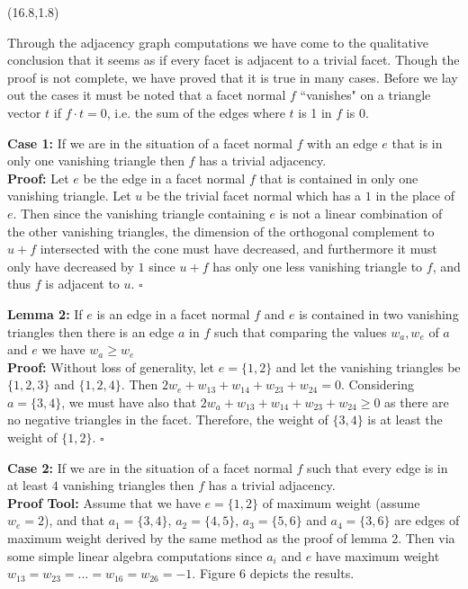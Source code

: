 \documentclass[a0,landscape]{a0poster}  %
\theoremstyle{plain}
\def\LARGEhead#1{\noindent{\LARGE\color{DarkBlue} #1}}
\begin{document}


\begin{textblock}{9.7}(16.8,1.8)

\LARGEhead{Results of the project}

\large{ Through the adjacency graph computations we have come to the qualitative conclusion that it seems as if every facet is adjacent to a trivial facet.  Though the proof is not complete, we have proved that it is true in many cases. Before we lay out the cases it must be noted that a facet normal $f$ ``vanishes" on a triangle vector $t$ if $f \cdot t = 0$, i.e. the sum of the edges where $t$ is 1 in $f$ is $0$. 
}

\large{ {\bf Case 1: } If we are in the situation of a facet normal $f$ with an edge $e$ that is in only one vanishing triangle then $f$ has a trivial adjacency. \\
}
\large{ {\bf Proof: } Let $e$ be the edge in a facet normal $f$ that is contained in only one vanishing triangle. Let $u$ be the trivial facet normal which has a $1$ in the place of $e$. Then since the vanishing triangle containing $e$ is not a linear combination of the other vanishing triangles, the dimension of the orthogonal complement to $u+f$ intersected with the cone must have decreased, and furthermore it must only have decreased by $1$ since $u+f$ has only one less vanishing triangle to $f$, and thus $f$ is adjacent to $u$.  \hfill $\square$
}

\large{{\bf Lemma 2: } If $e$ is an edge in a facet normal $f$ and $e$ is contained in two vanishing triangles then there is an edge $a$ in $f$ such that comparing the values $w_a,w_e$ of $a$ and $e$ we have $w_a \geq w_e$ \\ 
}
\large{{\bf Proof: }  Without loss of generality, let $e = \{1,2\}$ and let the vanishing triangles be $\{1,2,3\}$ and $\{1,2,4\}$. Then  $2w_e+w_{13}+w_{14}+w_{23}+w_{24} = 0$.  Considering $a=\{3,4\}$, we must have also that $2w_a+w_{13}+w_{14}+w_{23}+w_{24} \geq 0$ as there are no negative triangles in the facet.  Therefore, the weight of $\{3,4\}$ is at least the weight of $\{1,2\}$. \hfill $\square$
}

\large{{\bf Case 2: } If we are in the situation of a facet normal $f$ such that every edge is in at least $4$ vanishing triangles then $f$ has a trivial adjacency. \\
}
\large{{\bf Proof Tool:}  Assume that we have $e = \{1,2\}$ of maximum weight (assume $w_e = 2$), and that $a_1 = \{3,4\}$, $a_2=\{4,5\}$, $a_3=\{5,6\}$    and $a_4 = \{3,6\}$ are edges of maximum weight derived by the same method as the proof of lemma 2. Then via some simple linear algebra computations since $a_i$ and $e$ have maximum weight $w_{13}=w_{23}=...= w_{16}=w_{26} = -1$. Figure 6 depicts the results.}
\end{textblock}
\end{document}
